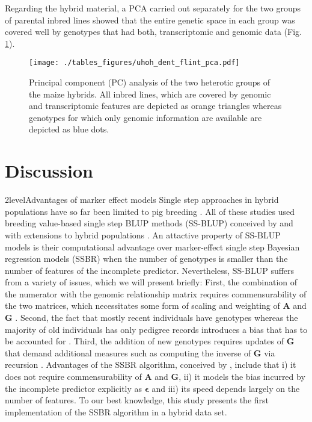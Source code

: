\documentclass[12pt,titlepage]{article}
\begin{document}
Regarding the hybrid material, a PCA carried out separately for the two groups
of parental inbred lines showed that the entire genetic space in each group 
was covered well by genotypes that had both, transcriptomic and genomic data 
(Fig. \ref{fig:UHOH-PCA}).

\begin{figure}[H]
\centering
\texttt{[image: ./tables\_figures/uhoh\_dent\_flint\_pca.pdf]}
\caption{
  Principal component (PC) analysis of the two heterotic groups of the maize 
  hybrids.
  All inbred lines, which are covered by genomic and transcriptomic features
  are depicted as orange triangles whereas genotypes for which only genomic
  information are available are depicted as blue dots.
}
\label{fig:UHOH-PCA}
\end{figure}













\section*{Discussion}
\Genetics2level{Advantages of marker effect models}
Single step approaches in hybrid populations have so far been limited to pig
breeding \cite{Xiang2015,Xiang2016,Tusell2016}.
All of these studies used breeding value-based single step BLUP methods
(SS-BLUP) conceived by  and  with
extensions to hybrid populations \cite{Christensen2014,Christensen2015}.
An attactive property of SS-BLUP models is their computational advantage over 
marker-effect single step Bayesian regression models (SSBR) when the number of 
genotypes is smaller than the number of features of the incomplete predictor.
Nevertheless, SS-BLUP suffers from a variety of issues, which we will present
briefly:
First, the combination of the numerator with the genomic relationship matrix
requires commensurability of the two matrices, which necessitates some form of
scaling and weighting of $\mathbf{A}$ and $\mathbf{G}$
\cite{Christensen2012,Christensen2012a}.
Second, the fact that mostly recent individuals have genotypes whereas the 
majority of old individuals has only pedigree records introduces a bias that 
has to be accounted for \cite{Vitezica2011,Legarra2015,Garcia-Baccino2017}.
Third, the addition of new genotypes requires updates of $\mathbf{G}$ that
demand additional measures such as computing the inverse of $\mathbf{G}$ via
recursion
\cite{Misztal2014,Misztal2016,Misztal2016a,Fragomeni2015,Masuda2016,Pocrnic2016}.
Advantages of the SSBR algorithm, conceived by , include
that i) it does not require commensurability of $\mathbf{A}$ and $\mathbf{G}$, 
ii) it models the bias incurred by the incomplete predictor explicitly as 
$\mathbf{\epsilon}$ and iii) its speed depends largely on the number of 
features.
To our best knowledge, this study presents the first implementation of the SSBR 
algorithm in a hybrid data set.
\end{document}
